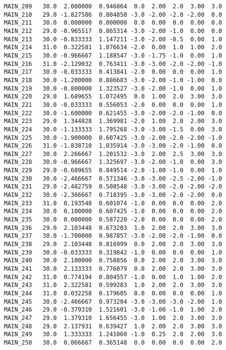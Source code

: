 \documentclass[a4paper,10pt,onecolumn,oneside,openright]{article}
\begin{document}
\begin{verbatim}
MAIN_209   30.0  2.000000  0.946864  0.0  2.00  2.0  3.00  3.0
MAIN_210   29.0 -1.827586  0.804850 -3.0 -2.00 -2.0 -2.00  0.0
MAIN_211   30.0  0.000000  0.000000  0.0  0.00  0.0  0.00  0.0
MAIN_212   29.0 -0.965517  0.865314 -3.0 -2.00 -1.0  0.00  0.0
MAIN_213   30.0 -0.833333  1.147211 -3.0 -2.00 -0.5  0.00  1.0
MAIN_214   31.0  0.322581  1.076634 -2.0  0.00  1.0  1.00  2.0
MAIN_215   30.0 -0.966667  1.188547 -3.0 -1.75 -1.0  0.00  1.0
MAIN_216   31.0 -2.129032  0.763411 -3.0 -3.00 -2.0 -2.00 -1.0
MAIN_217   30.0 -0.033333  0.413841 -2.0  0.00  0.0  0.00  1.0
MAIN_218   30.0 -1.200000  0.886683 -3.0 -2.00 -1.0 -1.00  0.0
MAIN_219   30.0 -0.800000  1.323527 -3.0 -2.00 -1.0  0.00  1.0
MAIN_220   29.0  1.689655  1.072495  0.0  1.00  2.0  3.00  3.0
MAIN_221   30.0 -0.033333  0.556053 -2.0  0.00  0.0  0.00  1.0
MAIN_222   30.0 -1.600000  0.621455 -3.0 -2.00 -2.0 -1.00  0.0
MAIN_223   29.0  1.344828  1.369981 -2.0  1.00  2.0  2.00  3.0
MAIN_224   30.0 -1.133333  1.795268 -3.0 -3.00 -1.5  0.00  3.0
MAIN_225   30.0 -1.900000  0.607425 -3.0 -2.00 -2.0 -2.00 -1.0
MAIN_226   31.0 -1.838710  1.035914 -3.0 -3.00 -2.0 -1.00  0.0
MAIN_227   30.0  2.266667  1.201532 -3.0  2.00  2.5  3.00  3.0
MAIN_228   30.0 -0.966667  1.325697 -3.0 -2.00 -1.0  0.00  3.0
MAIN_229   29.0 -0.689655  0.849514 -2.0 -1.00 -1.0  0.00  1.0
MAIN_230   30.0 -2.466667  0.571346 -3.0 -3.00 -2.5 -2.00 -1.0
MAIN_231   29.0 -2.482759  0.508548 -3.0 -3.00 -2.0 -2.00 -2.0
MAIN_232   30.0 -2.366667  0.718395 -3.0 -3.00 -2.0 -2.00  0.0
MAIN_233   31.0  0.193548  0.601074 -1.0  0.00  0.0  0.00  2.0
MAIN_234   30.0  0.100000  0.607425 -1.0  0.00  0.0  0.00  2.0
MAIN_235   30.0  0.000000  0.587220 -2.0  0.00  0.0  0.00  2.0
MAIN_236   29.0  2.103448  0.673203  1.0  2.00  2.0  3.00  3.0
MAIN_237   30.0 -1.700000  0.987857 -3.0 -2.00 -2.0 -1.00  0.0
MAIN_238   29.0  2.103448  0.816999  0.0  2.00  2.0  3.00  3.0
MAIN_239   30.0 -0.033333  0.319842 -1.0  0.00  0.0  0.00  1.0
MAIN_240   30.0  2.100000  0.758856  0.0  2.00  2.0  3.00  3.0
MAIN_241   30.0  2.133333  0.776079  0.0  2.00  2.0  3.00  3.0
MAIN_242   31.0  0.774194  0.804557 -1.0  0.00  1.0  1.00  2.0
MAIN_243   31.0  2.322581  0.599283  1.0  2.00  2.0  3.00  3.0
MAIN_244   31.0  0.032258  0.179605  0.0  0.00  0.0  0.00  1.0
MAIN_245   30.0 -2.466667  0.973204 -3.0 -3.00 -3.0 -2.00  1.0
MAIN_246   29.0 -0.379310  1.521601 -3.0 -1.00 -1.0  1.00  2.0
MAIN_247   29.0  1.379310  1.656455 -3.0  1.00  2.0  3.00  3.0
MAIN_248   29.0  2.137931  0.639427  1.0  2.00  2.0  3.00  3.0
MAIN_249   30.0  1.333333  1.241060 -1.0  0.25  2.0  2.00  3.0
MAIN_250   30.0  0.066667  0.365148  0.0  0.00  0.0  0.00  2.0

\end{verbatim}
\end{document}
